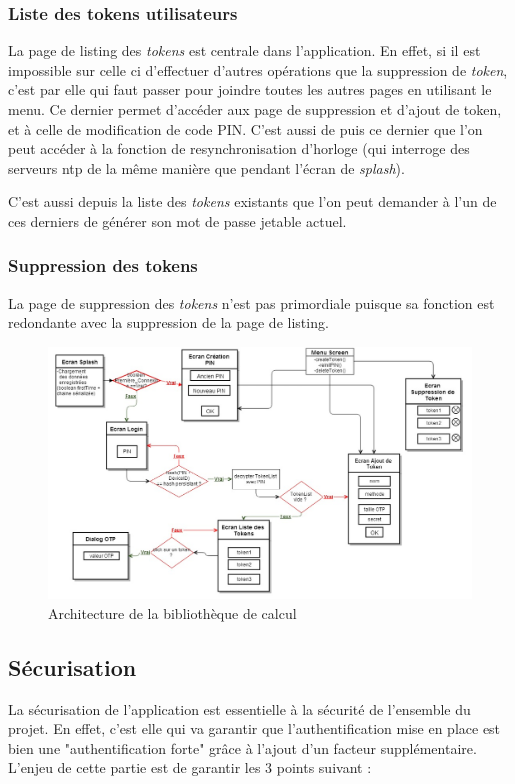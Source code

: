 \subsubsection{Liste des tokens utilisateurs}
La page de listing des \emph{tokens} est centrale dans l'application. En effet, si il est impossible sur
celle ci d'effectuer d'autres opérations que la suppression de \emph{token}, c'est par elle qui faut 
passer pour joindre toutes les autres pages en utilisant le menu. Ce dernier permet d'accéder aux page
de suppression et d'ajout de token, et à celle de modification de code PIN. C'est aussi de puis ce
dernier que l'on peut accéder à la fonction de resynchronisation d'horloge (qui interroge des serveurs
ntp de la même manière que pendant l'écran de \emph{splash}).

C'est aussi depuis la liste des \emph{tokens} existants que l'on peut demander à l'un de ces derniers 
de générer son mot de passe jetable actuel.

\subsubsection{Suppression des tokens}
La page de suppression des \emph{tokens} n'est pas primordiale puisque sa fonction est redondante avec
la suppression de la page de listing.

\begin{figure}
  \centering
  \includegraphics[scale=0.4]{../graphics/archi-android.jpg}
  \caption{Architecture de la bibliothèque de calcul}
  \label{fig:umlLib}
\end{figure}

\subsection{Sécurisation}
\label{secu}
La sécurisation de l'application est essentielle à la sécurité de l'ensemble du projet. En
effet, c'est elle qui va garantir que l'authentification mise en place est bien une
"authentification forte" grâce à l'ajout d'un facteur supplémentaire. L'enjeu de cette 
partie est de garantir les 3 points suivant : 



